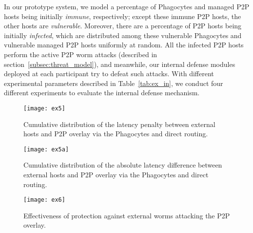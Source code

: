 \documentclass[times,10pt,twocolumn]{article}
\begin{document}
In our prototype system, we model a percentage of Phagocytes and
managed P2P hosts being initially \emph{immune}, respectively;
except these immune P2P hosts, the other hosts are
\emph{vulnerable}. Moreover, there are a percentage of P2P hosts
being initially \emph{infected}, which are distributed among these
vulnerable Phagocytes and vulnerable managed P2P hosts uniformly at
random. All the infected P2P hosts perform the active P2P worm
attacks (described in section~\ref{subsec:threat_model}), and
meanwhile, our internal defense modules deployed at each participant
try to defeat such attacks. With different experimental parameters
described in Table~\ref{tab:ex_in}, we conduct four different
experiments to evaluate the internal defense mechanism.






\begin{figure*}[tbp]
    \centering
    \begin{minipage}[t]{0.3\textwidth}
        \centering
        \texttt{[image: ex5]}
        \caption{Cumulative distribution of the latency penalty between external hosts and P2P overlay via the Phagocytes and direct routing.}
        \label{fig:ex5}
    \end{minipage} \quad
    \begin{minipage}[t]{0.3\textwidth}
        \centering
        \texttt{[image: ex5a]}
        \caption{Cumulative distribution of the absolute latency difference between external hosts and P2P overlay via the Phagocytes and direct routing.}
        \label{fig:ex5a}
    \end{minipage} \quad
    \begin{minipage}[t]{0.3\textwidth}
        \centering
        \texttt{[image: ex6]}
        \caption{Effectiveness of protection against external worms attacking the P2P overlay.}
        \label{fig:ex6}
    \end{minipage}
\end{figure*}
\end{document}
